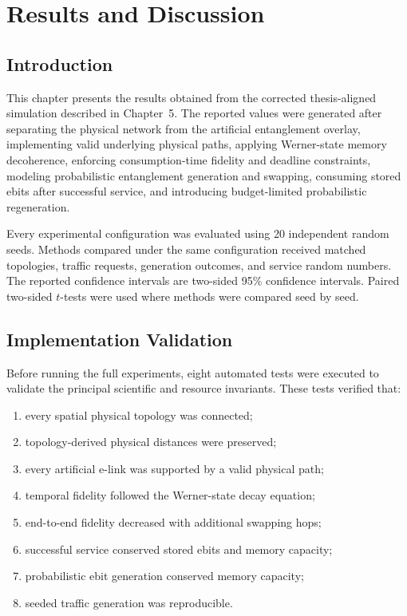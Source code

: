 \chapter{Results and Discussion}
\label{chap:results_discussion}

\section{Introduction}

This chapter presents the results obtained from the corrected
thesis-aligned simulation described in Chapter~5. The reported values were
generated after separating the physical network from the artificial
entanglement overlay, implementing valid underlying physical paths, applying
Werner-state memory decoherence, enforcing consumption-time fidelity and
deadline constraints, modeling probabilistic entanglement generation and
swapping, consuming stored ebits after successful service, and introducing
budget-limited probabilistic regeneration.

Every experimental configuration was evaluated using 20 independent random
seeds. Methods compared under the same configuration received matched
topologies, traffic requests, generation outcomes, and service random numbers.
The reported confidence intervals are two-sided 95\% confidence intervals.
Paired two-sided \(t\)-tests were used where methods were compared seed by seed.

\section{Implementation Validation}

Before running the full experiments, eight automated tests were executed to
validate the principal scientific and resource invariants. These tests verified
that:

\begin{enumerate}
    \item every spatial physical topology was connected;
    \item topology-derived physical distances were preserved;
    \item every artificial e-link was supported by a valid physical path;
    \item temporal fidelity followed the Werner-state decay equation;
    \item end-to-end fidelity decreased with additional swapping hops;
    \item successful service conserved stored ebits and memory capacity;
    \item probabilistic ebit generation conserved memory capacity;
    \item seeded traffic generation was reproducible.
\end{enumerate}


